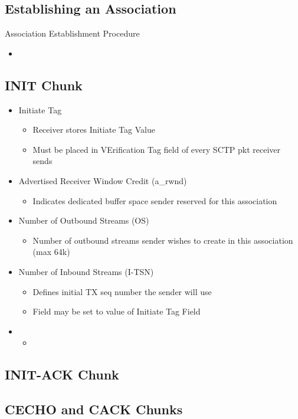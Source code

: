 \documentclass[a4paper]{article}
\begin{document}
\subsection{Establishing an Association}
Association Establishment Procedure
\begin{itemize}
	\item
\end{itemize}
\subsection{INIT Chunk}
\begin{itemize}
	\item Initiate Tag
	\begin{itemize}
		\item Receiver stores Initiate Tag Value
		\item Must be placed in VErification Tag field of every SCTP pkt
			receiver sends
	\end{itemize}
\item Advertised Receiver Window Credit (a\_rwnd)
	\begin{itemize}
		\item Indicates dedicated buffer space sender reserved for this
			association
	\end{itemize}
\item Number of Outbound Streams (OS)
	\begin{itemize}
		\item Number of outbound streams sender wishes to create in this
			association (max 64k)
	\end{itemize}
\item Number of Inbound Streams (I-TSN)
	\begin{itemize}
		\item Defines initial TX seq number the sender will use
		\item Field may be set to value of Initiate Tag Field
	\end{itemize}
	\item
	\begin{itemize}
		\item
	\end{itemize}
\end{itemize}
\subsection{INIT-ACK Chunk}
\subsection{C\OKIE ECHO and C\OKIE ACK Chunks}
\end{document}
